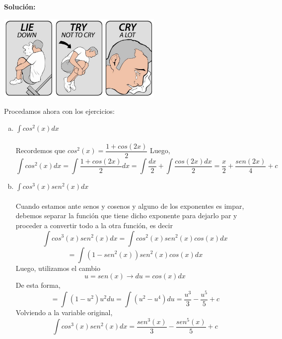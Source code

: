 \documentclass[12pt]{article}
\newenvironment{solucion}
{\begin{mdframed}[backgroundcolor=black!10]
		{\bf Solución:}\\
	}
	{
	\end{mdframed}
}
\newenvironment{preguntas}
{\begin{enumerate}\itemsep12pt
	}
	{
	\end{enumerate}
}
\newcommand{\ra}{\rightarrow}
\begin{document}
\begin{preguntas}
\begin{solucion}
\begin{center}
\includegraphics[width=8cm]{../../../../img/lie_down}
\end{center}
Procedamos ahora con los ejercicios:
\begin{enumerate}[a)]
\item $\displaystyle\int cos^2(x)dx$\\\\
			Recordemos que $cos^2(x) = \dfrac{1+cos(2x)}{2}$
			Luego,
			$$\displaystyle\int cos^2(x)dx 
			= \displaystyle\int \dfrac{1+cos(2x)}{2}dx
			= \displaystyle\int \dfrac{dx}{2} + \displaystyle\int \dfrac{cos(2x)dx}{2}
			= \dfrac{x}{2} + \dfrac{sen(2x)}{4} + c
			$$
\item $\displaystyle\int cos^3(x)sen^2(x)dx$\\\\
			Cuando estamos ante senos y cosenos y alguno de los exponentes es impar, debemos separar la función que tiene dicho exponente para dejarlo par y proceder a convertir todo a la otra función, es decir
			$$\displaystyle\int cos^3(x)sen^2(x)dx
			= \displaystyle\int cos^2(x)sen^2(x)cos(x)dx$$
			$$= \displaystyle\int (1-sen^2(x))sen^2(x)cos(x)dx$$
			Luego, utilizamos el cambio
			$$u = sen(x) \ra du = cos(x)dx$$
			De esta forma,
			$$= \displaystyle\int (1-u^2)u^2du
			= \displaystyle\int (u^2-u^4)du
			= \dfrac{u^3}{3} - \dfrac{u^5}{5} + c
			$$
			Volviendo a la variable original,
			$$\displaystyle\int cos^3(x)sen^2(x)dx 
			= \dfrac{sen^3(x)}{3} - \dfrac{sen^5(x)}{5} + c$$
			

\end{enumerate}
\end{solucion}
\end{preguntas}
\end{document}
